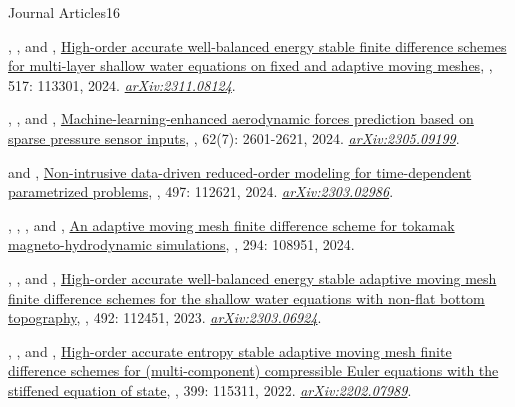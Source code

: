 \begin{cvpublicationsection}{Journal Articles}{16}
%
\item {}, , and , \href{https://doi.org/10.1016/j.jcp.2024.113301}{High-order accurate well-balanced energy stable finite difference schemes for multi-layer shallow water equations on fixed and adaptive moving meshes}, , 517: 113301, 2024. \href{https://arxiv.org/abs/2311.08124}{\em arXiv:2311.08124}.
%
\item {}, , and , \href{https://doi.org/10.2514/1.J063183}{Machine-learning-enhanced aerodynamic forces prediction based on sparse pressure sensor inputs}, , 62(7): 2601-2621, 2024. \href{https://arxiv.org/abs/2305.09199}{\em arXiv:2305.09199}.
%
\item {} and , \href{https://doi.org/10.1016/j.jcp.2023.112621}{Non-intrusive data-driven reduced-order modeling for time-dependent parametrized problems}, , 497: 112621, 2024. \href{https://arxiv.org/abs/2303.02986}{\em arXiv:2303.02986}.
%
\item {}, , , and , \href{https://doi.org/10.1016/j.cpc.2023.108951}{An adaptive moving mesh finite difference scheme for tokamak magneto-hydrodynamic simulations}, , 294: 108951, 2024.
%
\item {}, , and , \href{https://doi.org/10.1016/j.jcp.2023.112451}{High-order accurate well-balanced energy stable adaptive moving mesh finite difference schemes for the shallow water equations with non-flat bottom topography}, , 492: 112451, 2023. \href{https://arxiv.org/abs/2303.06924}{\em arXiv:2303.06924}.
%
\item {}, , and , \href{https://doi.org/10.1016/j.cma.2022.115311}{High-order accurate entropy stable adaptive moving mesh finite difference schemes for (multi-component) compressible Euler equations with the stiffened equation of state}, , 399: 115311, 2022. \href{https://arxiv.org/abs/2202.07989}{\em arXiv:2202.07989}.

\end{cvpublicationsection}
